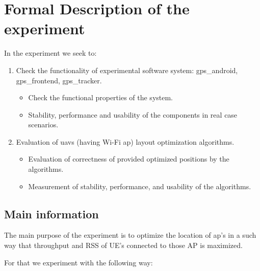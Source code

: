 \hypertarget{formal-description-of-the-experiment}{%
\section{Formal Description of the
experiment}\label{formal-description-of-the-experiment}}

In the experiment we seek to:

\begin{enumerate}
\def\labelenumi{\arabic{enumi}.}
\tightlist
\item
  Check the functionality of experimental software system: \gls{gps_android}, \gls{gps_frontend}, \gls{gps_tracker}.
  
  \begin{itemize}
  	\tightlist
  	\item
  	Check the functional properties of the system.
  	\item
  	Stability, performance and usability of the components in real case
  	scenarios.
  \end{itemize}

\item
  Evaluation of \acrshort{uav}s (having Wi-Fi \acrshort{ap}) layout
  optimization algorithms.
  
  \begin{itemize}
  	\tightlist
  	\item
  	Evaluation of correctness of provided optimized positions by the
  	algorithms.
  	\item
  	Measurement of stability, performance, and usability of the
  	algorithms.
  \end{itemize}
  
\end{enumerate}


\hypertarget{main-information}{%
\subsection{Main information}\label{main-information}}

The main purpose of the experiment is to optimize the location of \acrfull{ap}'s in 
a such way that throughput and RSS of UE's connected to those AP is
maximized.

For that we experiment with the following way:

